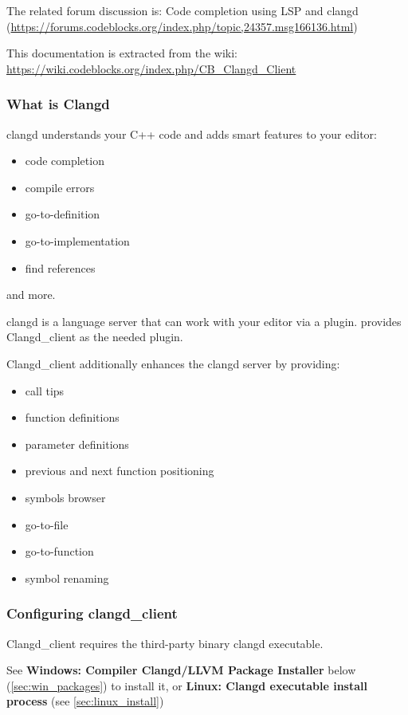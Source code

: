 The related forum discussion is: Code completion using LSP and clangd\newline
(\url{https://forums.codeblocks.org/index.php/topic,24357.msg166136.html})

This documentation is extracted from the wiki: \url{https://wiki.codeblocks.org/index.php/CB_Clangd_Client}

\subsubsection{What is Clangd}

clangd understands your C++ code and adds smart features to your editor:
\begin{itemize}[noitemsep]
\item code completion
\item compile errors
\item go-to-definition
\item go-to-implementation
\item find references
\end{itemize}
and more.

clangd is a language server that can work with your editor via a plugin.\newline
\codeblocks provides Clangd\_client as the needed plugin.

Clangd\_client additionally enhances the clangd server by providing:
\begin{itemize}[noitemsep]
\item call tips
\item function definitions
\item parameter definitions
\item previous and next function positioning
\item symbols browser
\item go-to-file
\item go-to-function
\item symbol renaming
\end{itemize}

\subsubsection{Configuring clangd\_client}\label{sec:cfg_client}

Clangd\_client requires the third-party binary clangd executable.

See \textbf{Windows: Compiler Clangd/LLVM Package Installer} below (\ref{sec:win_packages}) to install it, or \textbf{Linux: Clangd executable install process} (see \ref{sec:linux_install})

